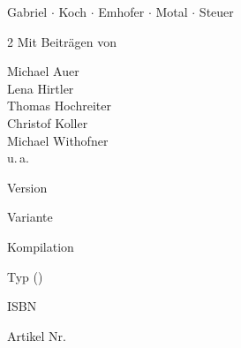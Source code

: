 {Gabriel {$\cdot$} Koch {$\cdot$} Emhofer {$\cdot$} Motal {$\cdot$} Steuer}%
{%
\begin{multicols}{2}\color{BaseLight}\setlength{\parskip}{2pt}
		{Mit Beiträgen von }
		\vspace{0.5em}
		
		{\color{Base}\ttfamily Michael Auer\\
		Lena Hirtler\\
		Thomas Hochreiter\\
		Christof Koller\\ 
		Michael Withofner\\
		u.\,a.}
		\columnbreak
		
		
%		
%		
%		
%		
		Version \hfill {\color{Base}\ttfamily\bfseries \VarDocVersionPrimaryExplicit} 
		
		Variante \hfill {\color{Base}\ttfamily\bfseries\VarDocVariant}
		
		Kompilation \hfill 
		{\ttfamily\bfseries%
		{\color{Base}\VarDocCompilation}
		{\color{DefaultRed}\VarDocCompilation}%
		}
		
		\vspace{0.5em}
		
		Typ \hfill {\ttfamily{\VarDocVersionTypeName} 
		\newline\hfill({\VarDocVersionTypeDescription})}
		
		\vspace{0.5em}
		
		ISBN \hfill {\color{Base}\ttfamily\VarAassIsbn}
		
		Artikel Nr. \hfill {\color{Base}\ttfamily\VarAassArtNr}
\end{multicols}
}%
{\ARGE}%